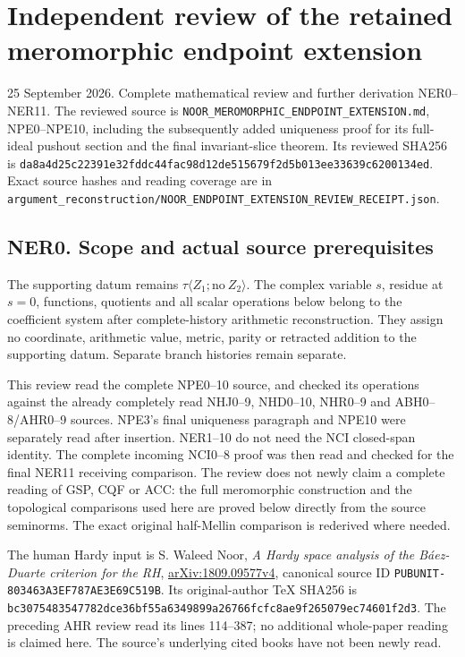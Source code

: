 \section{Independent review of the retained meromorphic endpoint
extension}\label{independent-review-of-the-retained-meromorphic-endpoint-extension}

25 September 2026. Complete mathematical review and further derivation
NER0--NER11. The reviewed source is
\nolinkurl{NOOR_MEROMORPHIC_ENDPOINT_EXTENSION.md}, NPE0--NPE10,
including the subsequently added uniqueness proof for its full-ideal
pushout section and the final invariant-slice theorem. Its reviewed
SHA256 is
\nolinkurl{da8a4d25c22391e32fddc44fac98d12de515679f2d5b013ee33639c6200134ed}.
Exact source hashes and reading coverage are in
\nolinkurl{argument_reconstruction/NOOR_ENDPOINT_EXTENSION_REVIEW_RECEIPT.json}.

\subsection{NER0. Scope and actual source
prerequisites}\label{ner0.-scope-and-actual-source-prerequisites}

The supporting datum remains
\(\tau\langle Z_1;\mathrm{no}\ Z_2\rangle\). The complex variable \(s\),
residue at \(s=0\), functions, quotients and all scalar operations below
belong to the coefficient system after complete-history arithmetic
reconstruction. They assign no coordinate, arithmetic value, metric,
parity or retracted addition to the supporting datum. Separate branch
histories remain separate.

This review read the complete NPE0--10 source, and checked its
operations against the already completely read NHJ0--9, NHD0--10,
NHR0--9 and ABH0--8/AHR0--9 sources. NPE3's final uniqueness paragraph
and NPE10 were separately read after insertion. NER1--10 do not need the
NCI closed-span identity. The complete incoming NCI0--8 proof was then
read and checked for the final NER11 receiving comparison. The review
does not newly claim a complete reading of GSP, CQF or ACC: the full
meromorphic construction and the topological comparisons used here are
proved below directly from the source seminorms. The exact original
half-Mellin comparison is rederived where needed.

The human Hardy input is S. Waleed Noor, \emph{A Hardy space analysis of
the Báez-Duarte criterion for the RH},
\href{https://arxiv.org/abs/1809.09577v4}{arXiv:1809.09577v4}, canonical
source ID \nolinkurl{PUBUNIT-803463A3EF787AE3E69C519B}. Its
original-author TeX SHA256 is
\nolinkurl{bc3075483547782dce36bf55a6349899a26766fcfc8ae9f265079ec74601f2d3}.
The preceding AHR review read its lines 114--387; no additional
whole-paper reading is claimed here. The source's underlying cited books
have not been newly read.


